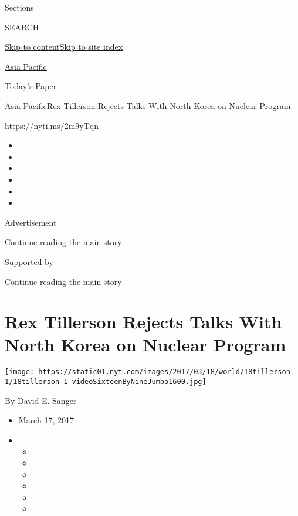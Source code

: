 Sections

SEARCH

\protect\hyperlink{site-content}{Skip to
content}\protect\hyperlink{site-index}{Skip to site index}

\href{https://www.nytimes.com/section/world/asia}{Asia Pacific}

\href{https://myaccount.nytimes.com/auth/login?response_type=cookie\&client_id=vi}{}

\href{https://www.nytimes.com/section/todayspaper}{Today's Paper}

\href{/section/world/asia}{Asia Pacific}\textbar{}Rex Tillerson Rejects
Talks With North Korea on Nuclear Program

\url{https://nyti.ms/2m9yTqn}

\begin{itemize}
\item
\item
\item
\item
\item
\item
\end{itemize}

Advertisement

\protect\hyperlink{after-top}{Continue reading the main story}

Supported by

\protect\hyperlink{after-sponsor}{Continue reading the main story}

\hypertarget{rex-tillerson-rejects-talks-with-north-korea-on-nuclear-program}{%
\section{Rex Tillerson Rejects Talks With North Korea on Nuclear
Program}\label{rex-tillerson-rejects-talks-with-north-korea-on-nuclear-program}}

\texttt{[image: https://static01.nyt.com/images/2017/03/18/world/18tillerson-1/18tillerson-1-videoSixteenByNineJumbo1600.jpg]}

By \href{http://www.nytimes.com/by/david-e-sanger}{David E. Sanger}

\begin{itemize}
\item
  March 17, 2017
\item
  \begin{itemize}
  \item
  \item
  \item
  \item
  \item
  \item
  \end{itemize}
\end{itemize}

